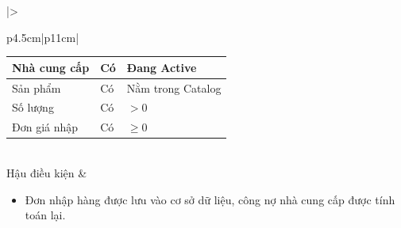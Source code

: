 \documentclass[12pt,a4paper]{report}
\begin{document}
\begin{longtable}{|>{\raggedright\arraybackslash\bfseries}p{4.5cm}|p{11cm}|}
\begin{tabular}{|p{3.5cm}|p{2.5cm}|p{4cm}|}
Nhà cung cấp & Có & Đang Active \\ \hline
Sản phẩm & Có & Nằm trong Catalog \\ \hline
Số lượng & Có & $> 0$ \\ \hline
Đơn giá nhập & Có & $\ge 0$ \\ \hline
\end{tabular} \\ \hline
Hậu điều kiện & 
\begin{itemize}[leftmargin=*, nosep, topsep=0pt, partopsep=0pt]
    \item Đơn nhập hàng được lưu vào cơ sở dữ liệu, công nợ nhà cung cấp được tính toán lại.
\end{itemize} \\ \hline
\end{longtable}

\vspace{0.5cm}
\end{document}
